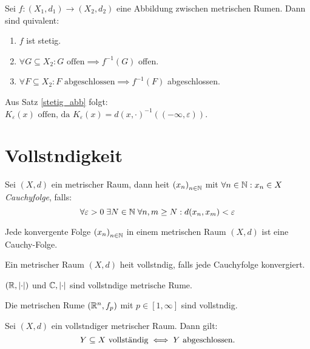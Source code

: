 \begin{theorem}
	\label{stetig_abb}Sei \(f: (X_1, d_1) \to (X_2, d_2)\) eine Abbildung zwischen metrischen R\as umen. Dann sind \as quivalent:
	\begin{enumerate}[noitemsep]
		\item $f$ ist stetig.
		\item \(\forall G \subseteq X_2: G \text{ offen} \implies f^{-1}(G)\) offen.
		\item \(\forall F \subseteq X_2: F \text{ abgeschlossen} \implies f^{-1}(F)\) abgeschlossen.
	\end{enumerate}
\end{theorem}

\begin{rem}
	Aus Satz \ref{stetig_abb} folgt: 
	\(K_\varepsilon(x) \text{ offen, da } K_\varepsilon(x) = d(x, \cdot)^{-1}((-\infty, \varepsilon))\).
\end{rem}

\section{Vollst\as ndigkeit}

\begin{definition}
	Sei $(X,d)$ ein metrischer Raum, dann hei\s t $\left (x_n\right )_{n\in \mathbb{N}}$ mit $\forall n \in \mathbb{N}: x_n \in X$ \textit{Cauchyfolge}, falls:
	\[\forall \varepsilon > 0 \; \exists N \in \mathbb{N} \; \forall n, m \geq N: d(x_n, x_m) < \varepsilon\]
\end{definition}

\begin{theorem}
	Jede konvergente Folge $\left (x_n\right )_{n\in \mathbb{N}}$ in einem metrischen Raum $(X, d)$ ist eine Cauchy-Folge.
\end{theorem}

\begin{definition}
	Ein metrischer Raum $(X, d)$ hei\s t vollst\as ndig, falls jede Cauchyfolge konvergiert.
\end{definition}

\begin{ex}
	\((\mathbb{R}, \left\lvert \cdot \right\rvert)\) und \(\mathbb{C}, \left\lvert \cdot \right\rvert\) sind vollst\as ndige metrische R\as ume. 
\end{ex}

\begin{ex}
	Die metrischen R\as ume  \((\mathbb{R}^n, f_p)\) mit \(p \in [1, \infty]\) sind vollst\as ndig.
\end{ex}

\begin{theorem}
	Sei \((X, d)\) ein vollst\as ndiger metrischer Raum. Dann gilt: 
	\[ Y \subseteq X \text{ vollst{\"a}ndig} \iff Y \text{ abgeschlossen.}\]
\end{theorem}

